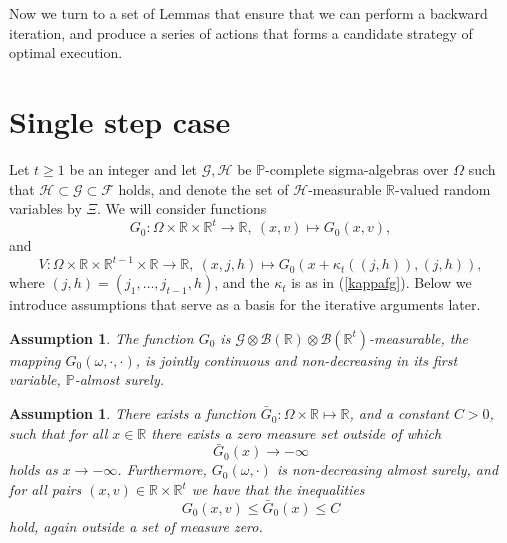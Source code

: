\documentclass[a4paper]{article}
\newtheorem{assumption}[theorem]{Assumption}
\begin{document}
Now we turn to a set of Lemmas that ensure that we can perform a backward iteration, 
and produce a series of actions that forms a candidate strategy of optimal execution.



\section{Single step case}\label{single}

Let $t\geq 1$ be an integer and let $\mathcal{G}, \mathcal{H}$ be $\mathbb{P}$-complete sigma-algebras 
over $\Omega$ such that $\mathcal{H} \subset \mathcal{G} \subset \mathcal{F}$ holds, and denote the set of $\mathcal{H}$-measurable 
$\mathbb{R}$-valued random variables by $\Xi$. We will consider functions
$$G_0:\Omega\times \mathbb{R} \times \mathbb{R}^{t}  \to \mathbb{R}, \ (x,v) \mapsto G_0(x,v),$$
and
$$V:\Omega\times \mathbb{R} \times \mathbb{R}^{t-1} \times \mathbb{R} \to \mathbb{R}, \ (x,j,h) \mapsto G_0(x + \kappa_{t}((j,h)),(j,h)),$$
where $(j,h) = (j_1,\hdots,j_{t-1},h)$, and the $\kappa_t$ is as in (\ref{kappafg}). Below we introduce assumptions that serve as a basis 
for the iterative arguments later.

\begin{assumption}\label{A1}
The function $G_0$ is 
$\mathcal{G}\otimes\mathcal{B}(\mathbb{R})\otimes\mathcal{B}(\mathbb{R}^{t})$-measurable, the mapping $G_0(\omega,\cdot, \cdot)$, is jointly continuous 
and non-decreasing in its first variable, $\mathbb{P}$-almost surely. 
\end{assumption}

\begin{assumption}\label{A2}
There exists a function $\bar G_0:\Omega\times\mathbb{R} \mapsto \mathbb{R}$, and a constant $C >0$, such that for all $x \in \mathbb{R}$ there exists a zero measure set outside of which 
$$\bar G_0(x) \to - \infty$$
holds as $x \to -\infty$. Furthermore, $G_0(\omega,\cdot)$ is non-decreasing almost surely, and for all pairs $(x, v) \in \mathbb{R} \times \mathbb{R}^{t}$ we have that the inequalities
\begin{equation*}
G_0(x,v) \leq \bar G_0(x) \leq C
\end{equation*}
hold, again outside a set of measure zero.
\end{assumption}
\end{document}
